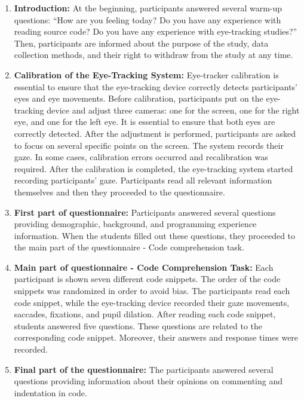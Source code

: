 \begin{enumerate}
    \item \textbf{Introduction:} At the beginning, participants answered several warm-up questions: “How are you feeling today? Do you have any experience with reading source code? Do you have any experience with eye-tracking studies?”  Then, participants are informed about the purpose of the study, data collection methods, and their right to withdraw from the study at any time.

    \item \textbf{Calibration of the Eye-Tracking System:} 
    Eye-tracker calibration is essential to ensure that the eye-tracking device correctly detects participants’ eyes and eye movements. Before calibration, participants put on the eye-tracking device and adjust three cameras: one for the screen, one for the right eye, and one for the left eye. It is essential to ensure that both eyes are correctly detected. After the adjustment is performed, participants are asked to focus on several specific points on the screen. The system records their gaze. In some cases, calibration errors occurred and recalibration was required. After the calibration is completed, the eye-tracking system started recording participants’ gaze. Participants read all relevant information themselves and then they proceeded to the questionnaire.
    
    \item \textbf{First part of questionnaire:}  
    Participants answered several questions providing demographic, background, and programming experience information. When the students filled out these questions, they proceeded to the main part of the questionnaire - Code comprehension task.

    \item \textbf{Main part of questionnaire - Code Comprehension Task:}  Each participant is shown seven different code snippets. The order of the code snippets was randomized in order to avoid bias. The participants read each code snippet, while the eye-tracking device recorded their gaze movements, saccades, fixations, and pupil dilation. After reading each code snippet, students answered five questions. These questions are related to the corresponding code snippet. Moreover, their answers and response times were recorded.

    \item \textbf{Final part of the questionnaire:} 
    The participants answered several questions providing information about their opinions on commenting and indentation in code.


\end{enumerate}
